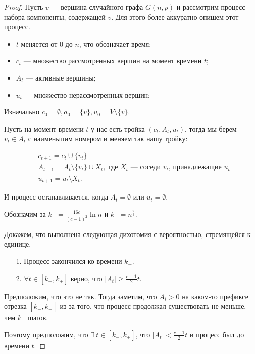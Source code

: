 \begin{proof}
  Пусть $v$ --- вершина случайного графа $G(n, p)$ и рассмотрим процесс набора
  компоненты, содержащей $v$. Для этого более аккуратно опишем этот процесс.

  \begin{itemize}
    \item $t$ меняется от 0 до $n$, что обозначает время;
    \item $c_t$ --- множество рассмотренных вершин на момент времени $t$;
    \item $A_t$ --- активные вершины;
    \item $u_t$ --- множество нерассмотренных вершин;
  \end{itemize}

  Изначально $c_0 = \emptyset, a_0 = \{v\}, u_0 = V \setminus \{v\}$.

  Пусть на момент времени $t$ у нас есть тройка $(c_t, A_t, u_t)$, тогда мы 
  берем $v_t \in A_t$ с наименьшим номером и меняем так нашу тройку:

  \begin{align}
    &c_{t + 1} = c_t \cup \{v_t\}\\
    &A_{t + 1} = A_t \setminus \{v_t\} \cup X_t, \text{ где $X_t$ --- соседи 
    $v_t$, принадлежащие $u_t$}\\
    &u_{t + 1} = u_t \setminus X_t.
  \end{align}

  И процесс останавливается, когда $A_t = \emptyset$ или $u_t = \emptyset$.

  Обозначим за $k_- = \frac{16c}{(c - 1)^2}\ln n$ и $k_+ = n^{\frac23}$.

  Докажем, что выполнена следующая дихотомия с вероятностью, стремящейся к единице.

  \begin{itemize}
    \item[1.] Процесс закончился ко времени $k_-$.
    \item[2.] $\forall t \in [k_-, k_+]$ верно, что $|A_t| \geq \frac{c - 1}{2} t$.
  \end{itemize}

  Предположим, что это не так. Тогда
  заметим, что $A_i > 0$ на каком-то префиксе отрезка $[k_-, k_+]$ из-за того, 
  что процесс продолжал существовать не меньше, чем $k_-$ шагов.

  Поэтому предположим, что $\exists \ t \in [k_-, k_+]$, что 
  $|A_t| < \frac{c - 1}{2} t$ и процесс был до времени $t$.


\end{proof}

